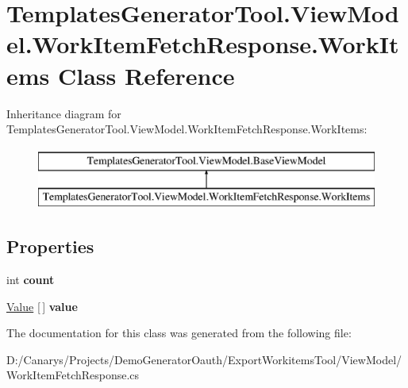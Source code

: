 \hypertarget{class_templates_generator_tool_1_1_view_model_1_1_work_item_fetch_response_1_1_work_items}{}\section{Templates\+Generator\+Tool.\+View\+Model.\+Work\+Item\+Fetch\+Response.\+Work\+Items Class Reference}
\label{class_templates_generator_tool_1_1_view_model_1_1_work_item_fetch_response_1_1_work_items}
Inheritance diagram for Templates\+Generator\+Tool.\+View\+Model.\+Work\+Item\+Fetch\+Response.\+Work\+Items\+:\begin{figure}[H]
\begin{center}
\leavevmode
\includegraphics[height=2.000000cm]{class_templates_generator_tool_1_1_view_model_1_1_work_item_fetch_response_1_1_work_items}
\end{center}
\end{figure}
\subsection*{Properties}
\begin{DoxyCompactItemize}
\item 
\mbox{\label{class_templates_generator_tool_1_1_view_model_1_1_work_item_fetch_response_1_1_work_items_a57d6663c312c9e721e9dd9361e4ef6ab}} 
int {\bfseries count}
\item 
\mbox{\label{class_templates_generator_tool_1_1_view_model_1_1_work_item_fetch_response_1_1_work_items_ad0c131ead2429c1cad29975be6d1aec8}} 
\mbox{\hyperlink{class_templates_generator_tool_1_1_view_model_1_1_work_item_fetch_response_1_1_value}{Value}} \mbox{[}$\,$\mbox{]} {\bfseries value}
\end{DoxyCompactItemize}


The documentation for this class was generated from the following file\+:\begin{DoxyCompactItemize}
\item 
D\+:/\+Canarys/\+Projects/\+Demo\+Generator\+Oauth/\+Export\+Workitems\+Tool/\+View\+Model/Work\+Item\+Fetch\+Response.\+cs\end{DoxyCompactItemize}
